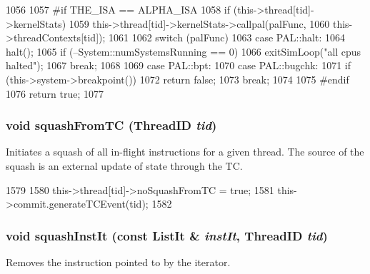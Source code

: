 \begin{DoxyCode}
1056 {
1057 #if THE_ISA == ALPHA_ISA
1058     if (this->thread[tid]->kernelStats)
1059         this->thread[tid]->kernelStats->callpal(palFunc,
1060                                                 this->threadContexts[tid]);
1061 
1062     switch (palFunc) {
1063       case PAL::halt:
1064         halt();
1065         if (--System::numSystemsRunning == 0)
1066             exitSimLoop("all cpus halted");
1067         break;
1068 
1069       case PAL::bpt:
1070       case PAL::bugchk:
1071         if (this->system->breakpoint())
1072             return false;
1073         break;
1074     }
1075 #endif
1076     return true;
1077 }
\end{DoxyCode}
\hypertarget{classFullO3CPU_ac4c7a18be5c282d711310ffb7b6f82f7}{
\subsubsection[{squashFromTC}]{\setlength{\rightskip}{0pt plus 5cm}void squashFromTC ({\bf ThreadID} {\em tid})}}
\label{classFullO3CPU_ac4c7a18be5c282d711310ffb7b6f82f7}
Initiates a squash of all in-\/flight instructions for a given thread. The source of the squash is an external update of state through the TC. 


\begin{DoxyCode}
1579 {
1580     this->thread[tid]->noSquashFromTC = true;
1581     this->commit.generateTCEvent(tid);
1582 }
\end{DoxyCode}
\hypertarget{classFullO3CPU_a2b698a48b0c233f49e2994bc28dc0bbf}{
\subsubsection[{squashInstIt}]{\setlength{\rightskip}{0pt plus 5cm}void squashInstIt (const {\bf ListIt} \& {\em instIt}, \/  {\bf ThreadID} {\em tid})}}
\label{classFullO3CPU_a2b698a48b0c233f49e2994bc28dc0bbf}
Removes the instruction pointed to by the iterator. 



